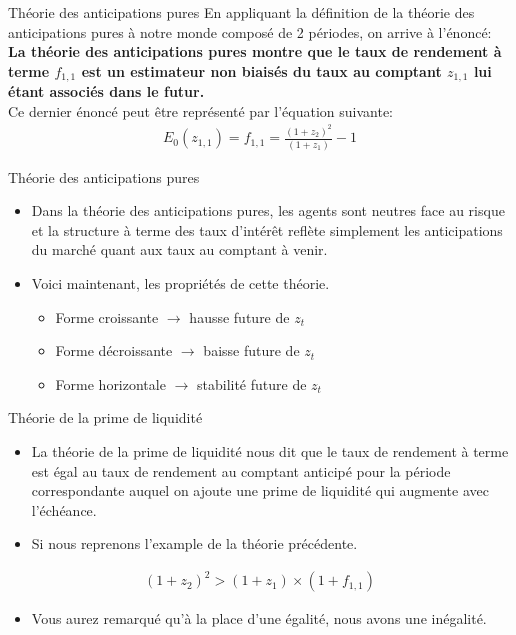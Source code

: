 \documentclass[11pt]{beamer}
\begin{document}
\begin{frame}{Théorie des anticipations pures}
En appliquant la définition de la théorie des anticipations pures à notre monde composé de 2 périodes, on arrive à l'énoncé: \\
\vspace{0.5cm}
 \textbf{La théorie des anticipations pures montre que le taux de rendement à terme $f_{1,1}$ est un estimateur non biaisés du taux au comptant $z_{1,1}$ lui étant associés dans le futur. }\\
 \vspace{0.5cm}
Ce dernier énoncé peut être représenté par l'équation suivante:
\begin{align*}
E_0(z_{1,1})=f_{1,1}=\frac{(1+z_2)^2}{(1+z_1)}-1
\end{align*}
\end{frame}

\begin{frame}{Théorie des anticipations pures}
\begin{itemize}
\item Dans la théorie des anticipations pures, les agents sont neutres face au risque et la structure à terme des taux d’intérêt reflète simplement les anticipations du marché quant aux taux au comptant à venir. 
\item Voici maintenant,  les propriétés de cette théorie.
\begin{itemize}
\item  Forme croissante $\rightarrow$ hausse future de $z_t$
\item Forme décroissante $\rightarrow$ baisse future de $z_t$
\item Forme horizontale $\rightarrow$ stabilité future de $z_t$
\end{itemize}
\end{itemize}
\end{frame}

\begin{frame}{Théorie de la prime de liquidité}
\begin{itemize}
\item La théorie de la prime de liquidité nous dit que le taux de rendement à terme est égal au taux de rendement au comptant anticipé pour la période correspondante auquel on ajoute une prime de liquidité qui augmente avec l’échéance.  
\item Si nous reprenons l'example de la théorie précédente.
\end{itemize}
\begin{align*}
(1+z_2)^2>(1+z_1) \times (1+f_{1,1})
\end{align*}
\begin{itemize}
\item Vous aurez remarqué qu'à la place d'une égalité, nous avons une inégalité.  
\end{itemize}
\end{frame}
\end{document}

